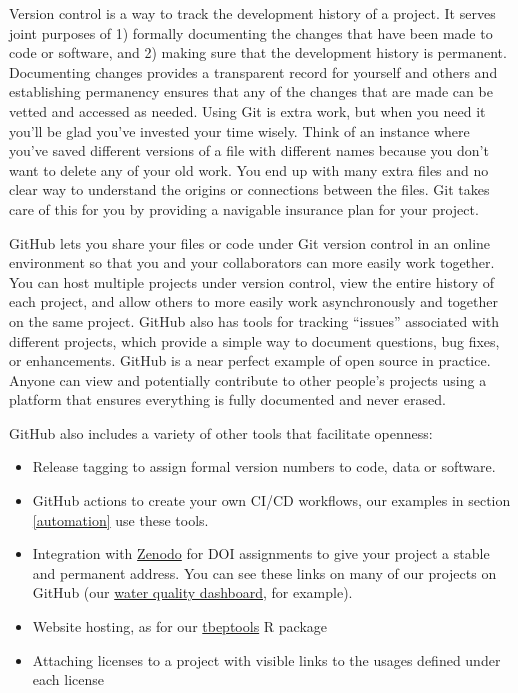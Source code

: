 \documentclass[
]{book}
\providecommand{\tightlist}{%
  \setlength{\itemsep}{0pt}\setlength{\parskip}{0pt}}
\begin{document}
Version control is a way to track the development history of a project. It serves joint purposes of 1) formally documenting the changes that have been made to code or software, and 2) making sure that the development history is permanent. Documenting changes provides a transparent record for yourself and others and establishing permanency ensures that any of the changes that are made can be vetted and accessed as needed. Using Git is extra work, but when you need it you'll be glad you've invested your time wisely. Think of an instance where you've saved different versions of a file with different names because you don't want to delete any of your old work. You end up with many extra files and no clear way to understand the origins or connections between the files. Git takes care of this for you by providing a navigable insurance plan for your project.

GitHub lets you share your files or code under Git version control in an online environment so that you and your collaborators can more easily work together. You can host multiple projects under version control, view the entire history of each project, and allow others to more easily work asynchronously and together on the same project. GitHub also has tools for tracking ``issues'' associated with different projects, which provide a simple way to document questions, bug fixes, or enhancements. GitHub is a near perfect example of open source in practice. Anyone can view and potentially contribute to other people's projects using a platform that ensures everything is fully documented and never erased.

GitHub also includes a variety of other tools that facilitate openness:

\begin{itemize}
\tightlist
\item
  Release tagging to assign formal version numbers to code, data or software.
\item
  GitHub actions to create your own CI/CD workflows, our examples in section \ref{automation} use these tools.
\item
  Integration with \href{https://zenodo.org/}{Zenodo} for DOI assignments to give your project a stable and permanent address. You can see these links on many of our projects on GitHub (our \href{https://github.com/tbep-tech/wq-dash}{water quality dashboard}, for example).\\
\item
  Website hosting, as for our \href{https://tbep-tech.github.io/tbeptools/}{tbeptools} R package
\item
  Attaching licenses to a project with visible links to the usages defined under each license
\end{itemize}
\end{document}
